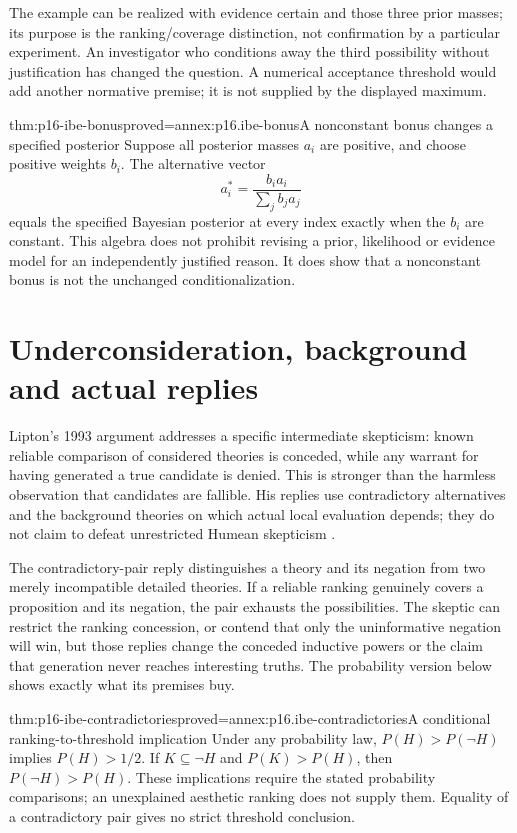 The example can be realized with evidence certain and those three prior
masses; its purpose is the ranking/coverage distinction, not confirmation
by a particular experiment. An investigator who conditions away the third
possibility without justification has changed the question. A numerical
acceptance threshold would add another normative premise; it is not supplied
by the displayed maximum.

\begin{hbtheorem}{thm:p16-ibe-bonus}{proved=annex:p16.ibe-bonus}{A nonconstant bonus changes a specified posterior}
Suppose all posterior masses \(a_i\) are positive, and choose positive
weights \(b_i\). The alternative vector
\[
                 a_i^*=\frac{b_i a_i}{\sum_jb_j a_j}
\]
equals the specified Bayesian posterior at every index exactly when the
\(b_i\) are constant. This algebra does not prohibit revising a prior,
likelihood or evidence model for an independently justified reason. It
does show that a nonconstant bonus is not the unchanged conditionalization.
\end{hbtheorem}

\section{Underconsideration, background and actual replies}
\label{sec:p16-ibe-bad-lot}

Lipton's 1993 argument addresses a specific intermediate skepticism:
known reliable comparison of considered theories is conceded, while any
warrant for having generated a true candidate is denied. This is stronger
than the harmless observation that candidates are fallible. His replies
use contradictory alternatives and the background theories on which
actual local evaluation depends; they do not claim to defeat unrestricted
Humean skepticism \cite[secs.~I--VII]{Lipton1993BestGoodEnough}.

The contradictory-pair reply distinguishes a theory and its negation from
two merely incompatible detailed theories. If a reliable ranking genuinely
covers a proposition and its negation, the pair exhausts the possibilities.
The skeptic can restrict the ranking concession, or contend that only the
uninformative negation will win, but those replies change the conceded
inductive powers or the claim that generation never reaches interesting
truths. The probability version below shows exactly what its premises buy.

\begin{hbtheorem}{thm:p16-ibe-contradictories}{proved=annex:p16.ibe-contradictories}{A conditional ranking-to-threshold implication}
Under any probability law, \(P(H)>P(\neg H)\) implies \(P(H)>1/2\).
If \(K\subseteq\neg H\) and \(P(K)>P(H)\), then
\(P(\neg H)>P(H)\). These implications require the stated probability
comparisons; an unexplained aesthetic ranking does not supply them.
Equality of a contradictory pair gives no strict threshold conclusion.
\end{hbtheorem}

